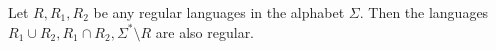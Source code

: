 

\setcounter{section}{3}
\setcounter{subsection}{1}
\setcounter{dfn}{1}

\begin{thm}
\label{thm:ClosRegLang}
Let $R, R_1, R_2$ be any regular languages in the alphabet $\Sigma$.
Then the languages $R_1 \cup R_2, R_1 \cap R_2, \Sigma^* \setminus R$ are also regular.
\end{thm}

